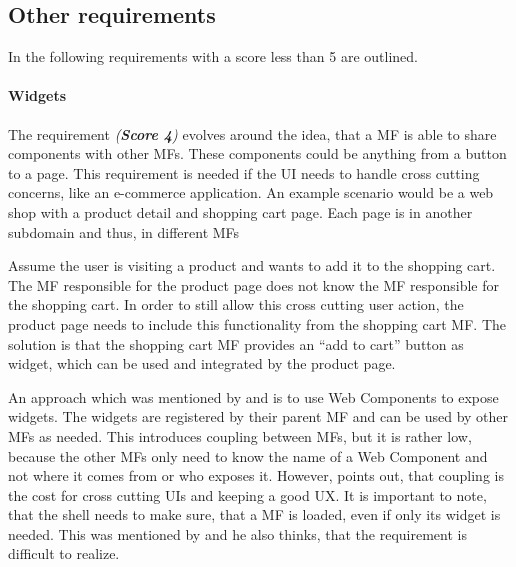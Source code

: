 \subsection{Other requirements}

In the following requirements with a score less than 5 are outlined.



\paragraph{Widgets} \label{cha:requirement_detail_integration_widget}

The requirement \textit{ (\textbf{Score 4})} evolves around the idea, that a \ac{MF} is able to share components with other \acp{MF}.
These components could be anything from a button to a page.
This requirement is needed if the \ac{UI} needs to handle cross cutting concerns, like an e-commerce application.
An example scenario would be a web shop with a product detail and shopping cart page.
Each page is in another subdomain and thus, in different \acp{MF}

Assume the user is visiting a product and wants to add it to the shopping cart.
The \ac{MF} responsible for the product page does not know the \ac{MF} responsible for the shopping cart.
In order to still allow this cross cutting user action, the product page needs to include this functionality from the shopping cart \ac{MF}.
The solution is that the shopping cart \ac{MF} provides an \enquote{add to cart} button as widget, which can be used and integrated by the product page.

An approach which was mentioned by \textciteRehm{} and \textciteHuber{} is to use Web Components to expose widgets.
The widgets are registered by their parent \ac{MF} and can be used by other \acp{MF} as needed.
This introduces coupling between \acp{MF}, but it is rather low, because the other \acp{MF} only need to know the name of a Web Component and not where it comes from or who exposes it.
However, \citeauthorRehm{} points out, that coupling is the cost for cross cutting \acp{UI} and keeping a good \ac{UX}.
It is important to note, that the shell needs to make sure, that a \ac{MF} is loaded, even if only its widget is needed.
This was mentioned by \citeauthorRehm{} and he also thinks, that the \textit{} requirement is difficult to realize.



